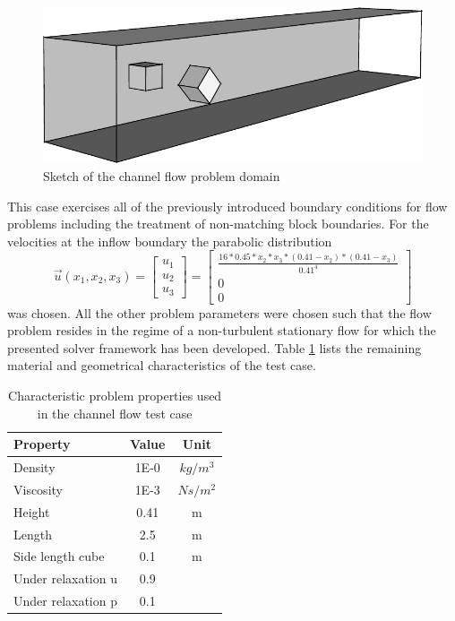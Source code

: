 \begin{figure}
  \centering
  \includegraphics{./img/channel3d.pdf}
  \caption{Sketch of the channel flow problem domain}
  \label{fig:sketch}
\end{figure}

This case exercises all of the previously introduced boundary conditions for flow problems including the treatment of non-matching block boundaries. For the velocities at the inflow boundary the parabolic distribution
\begin{displaymath}
  \vec{u}(x_1,x_2,x_3) 
  =
\left[
  \begin{array}{ccc}
    u_1 \\
    u_2 \\
    u_3 
  \end{array}
\right]
  =
\left[
  \begin{array}{ccc}
    \frac{ 16 * 0.45 * x_2 * x_3 * \left( 0.41 - x_2 \right) * \left( 0.41 - x_3 \right)}{0.41^4}
    \\[0.9em]
    0 \\[0.3em]
    0 
  \end{array}
\right]
\end{displaymath}
was chosen. All the other problem parameters were chosen such that the flow problem resides in the regime of a non-turbulent stationary flow for which the presented solver framework has been developed. Table \ref{tab:channel} lists the remaining material and geometrical characteristics of the test case.

\begin{table}[h!]\centering
  \caption{Characteristic problem properties used in the channel flow test case}
  \begin{tabular}{lcc}\toprule
    Property & Value & Unit \\
    \midrule
    \rowcolor{black!20} Density    & 1E-0 & $kg/m^3$  \\
    \rowcolor{black!00} Viscosity  & 1E-3 & $Ns/m^2$  \\
    \rowcolor{black!20} Height     & 0.41 & m         \\
    \rowcolor{black!00} Length     & 2.5  & m         \\
    \rowcolor{black!20} Side length cube & 0.1  & m   \\
    \rowcolor{black!00} Under relaxation u & 0.9 &    \\
    \rowcolor{black!20} Under relaxation p & 0.1 &    \\
  \end{tabular}
  \label{tab:channel}
\end{table}

